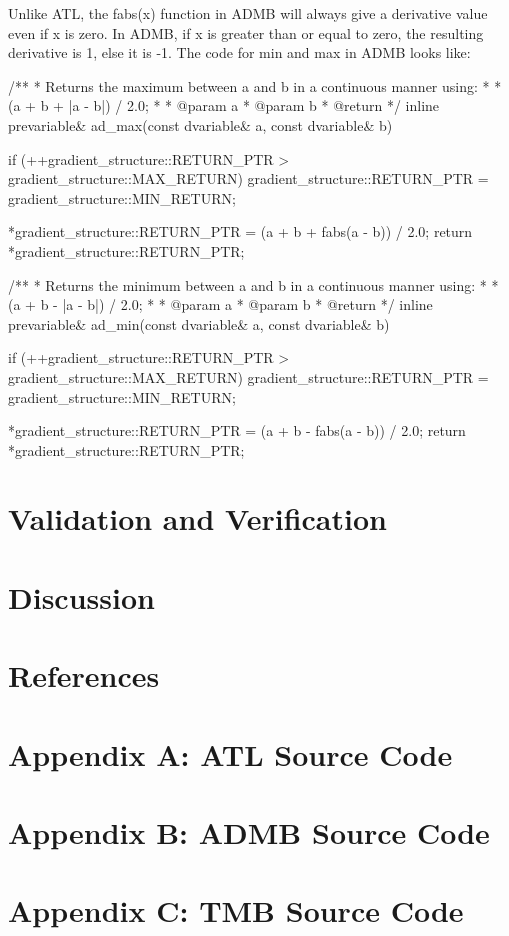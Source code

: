 \documentclass[oneside]{article}
\begin{document}
Unlike ATL, the fabs(x) function in ADMB will always give a derivative value even if x is zero. In ADMB, if x is greater than or equal to zero, the resulting derivative is 1, else it is -1.  The code for min and max in ADMB looks like: 
\begin{cppsource}

/**
 * Returns the maximum between a and b in a continuous manner using:
 * 
 * (a + b + |a - b|) / 2.0;
 * 
 * @param a
 * @param b
 * @return 
 */
inline prevariable& ad_max(const dvariable& a, const dvariable& b) {
    if (++gradient_structure::RETURN_PTR > gradient_structure::MAX_RETURN)
        gradient_structure::RETURN_PTR = gradient_structure::MIN_RETURN;

    *gradient_structure::RETURN_PTR = (a + b + fabs(a - b)) / 2.0;
    return *gradient_structure::RETURN_PTR;
}


/**
 * Returns the minimum between a and b in a continuous manner using:
 * 
 * (a + b - |a - b|) / 2.0;
 * 
 * @param a
 * @param b
 * @return 
 */
inline prevariable& ad_min(const dvariable& a, const dvariable& b) {
    if (++gradient_structure::RETURN_PTR > gradient_structure::MAX_RETURN)
        gradient_structure::RETURN_PTR = gradient_structure::MIN_RETURN;

    *gradient_structure::RETURN_PTR = (a + b - fabs(a - b)) / 2.0;
    return *gradient_structure::RETURN_PTR;
}

\end{cppsource} 


\section{Validation and Verification}

\section{Discussion}

\section{References}

\section{Appendix A: ATL Source Code}


\section{Appendix B: ADMB Source Code}


\section{Appendix C: TMB Source Code}
\end{document}
